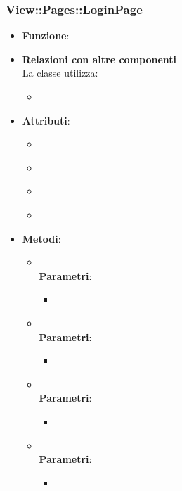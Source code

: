 \subsubsection{View::Pages::LoginPage}
\begin{itemize}
\item\textbf{Funzione}:
\item\textbf{Relazioni con altre componenti}\\
La classe utilizza:
	\begin{itemize}
		\item
	\end{itemize}
\item\textbf{Attributi}:
	\begin{itemize}
		\item\code{}\\
		\item\code{}\\
		\item\code{}\\
		\item\code{}\\
	\end{itemize}
\item\textbf{Metodi}:
	\begin{itemize}
		\item\code{}\\
		\textbf{Parametri}:
			\begin{itemize}
				\item\code{}\\
			\end{itemize}
		\item\code{}\\
		\textbf{Parametri}:
			\begin{itemize}
				\item\code{}\\
			\end{itemize}
		\item\code{}\\
		\textbf{Parametri}:
			\begin{itemize}
				\item\code{}\\
			\end{itemize}
		\item\code{}\\
		\textbf{Parametri}:
			\begin{itemize}
				\item\code{}\\
			\end{itemize}
	\end{itemize}
\end{itemize}

